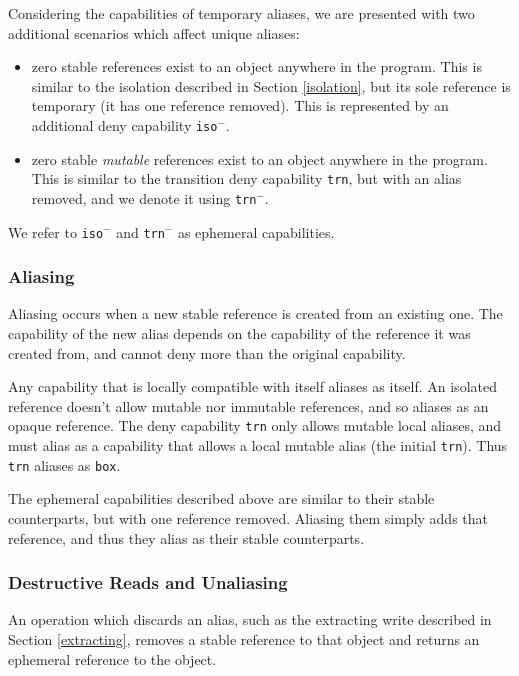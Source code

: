 Considering the capabilities of temporary aliases, we are presented with two additional scenarios which affect unique aliases:

\begin{itemize}
    \item zero stable references exist to an object anywhere in the program. This is similar to the isolation described in Section \ref{isolation}, but its sole reference is temporary (it has one reference removed). This is represented by an additional deny capability \texttt{iso$^-$}.
    \item zero stable \textit{mutable} references exist to an object anywhere in the program. This is similar to the transition deny capability \texttt{trn}, but with an alias removed, and we denote it using \texttt{trn$^-$}.
\end{itemize}

We refer to \texttt{iso$^-$} and \texttt{trn$^-$} as ephemeral capabilities.

\subsubsection{Aliasing}

Aliasing occurs when a new stable reference is created from an existing one. The capability of the new alias depends on the capability of the reference it was created from, and cannot deny more than the original capability.

Any capability that is locally compatible with itself aliases as itself. An isolated reference doesn't allow mutable nor immutable references, and so aliases as an opaque reference. The deny capability \texttt{trn} only allows mutable local aliases, and must alias as a capability that allows a local mutable alias (the initial \texttt{trn}). Thus \texttt{trn} aliases as \texttt{box}.

The ephemeral capabilities described above are similar to their stable counterparts, but with one reference removed. Aliasing them simply adds that reference, and thus they alias as their stable counterparts.

\subsubsection{Destructive Reads and Unaliasing}

An operation which discards an alias, such as the extracting write described in Section \ref{extracting}, removes a stable reference to that object and returns an ephemeral reference to the object.

